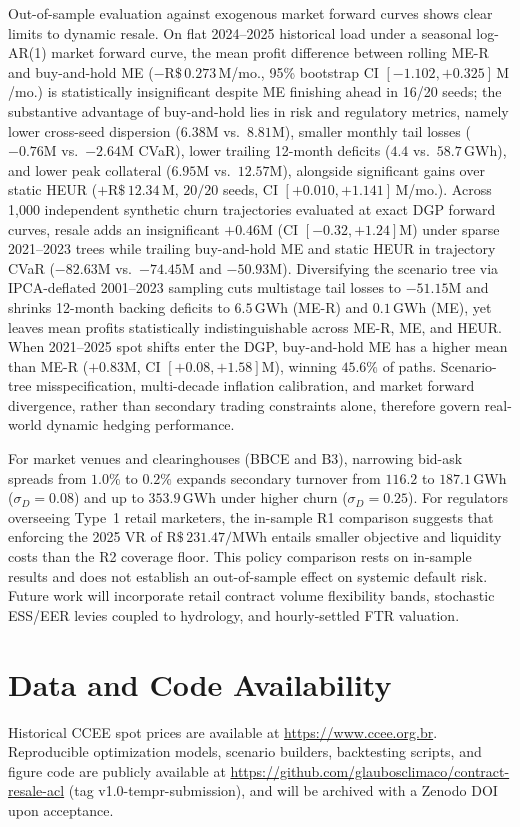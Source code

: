 \documentclass[10pt,journal]{IEEEtran}
\begin{document}
Out-of-sample evaluation against exogenous market forward curves shows clear limits to dynamic resale. On flat 2024--2025 historical load under a seasonal log-AR(1) market forward curve, the mean profit difference between rolling ME-R and buy-and-hold ME ($-\text{R\$}\,0.273\,\text{M}$/mo., 95\% bootstrap CI $[-1.102, +0.325]\,\text{M}$/mo.) is statistically insignificant despite ME finishing ahead in 16/20 seeds; the substantive advantage of buy-and-hold lies in risk and regulatory metrics, namely lower cross-seed dispersion ($6.38\text{M}$ vs.\ $8.81\text{M}$), smaller monthly tail losses ($-0.76\text{M}$ vs.\ $-2.64\text{M}$ CVaR), lower trailing 12-month deficits ($4.4$ vs.\ $58.7\,\text{GWh}$), and lower peak collateral ($6.95\text{M}$ vs.\ $12.57\text{M}$), alongside significant gains over static HEUR ($+\text{R\$}\,12.34\,\text{M}$, $20/20$ seeds, CI $[+0.010, +1.141]\,\text{M}$/mo.). Across 1,000 independent synthetic churn trajectories evaluated at exact DGP forward curves, resale adds an insignificant $+0.46\text{M}$ (CI $[-0.32, +1.24]\text{M}$) under sparse 2021--2023 trees while trailing buy-and-hold ME and static HEUR in trajectory CVaR ($-82.63\text{M}$ vs.\ $-74.45\text{M}$ and $-50.93\text{M}$). Diversifying the scenario tree via IPCA-deflated 2001--2023 sampling cuts multistage tail losses to $-51.15\text{M}$ and shrinks 12-month backing deficits to $6.5\,\text{GWh}$ (ME-R) and $0.1\,\text{GWh}$ (ME), yet leaves mean profits statistically indistinguishable across ME-R, ME, and HEUR. When 2021--2025 spot shifts enter the DGP, buy-and-hold ME has a higher mean than ME-R ($+0.83\text{M}$, CI $[+0.08, +1.58]\text{M}$), winning $45.6\%$ of paths. Scenario-tree misspecification, multi-decade inflation calibration, and market forward divergence, rather than secondary trading constraints alone, therefore govern real-world dynamic hedging performance.

For market venues and clearinghouses (BBCE and B3), narrowing bid-ask spreads from $1.0\%$ to $0.2\%$ expands secondary turnover from $116.2$ to $187.1\,\text{GWh}$ ($\sigma_D = 0.08$) and up to $353.9\,\text{GWh}$ under higher churn ($\sigma_D = 0.25$). For regulators overseeing Type~1 retail marketers, the in-sample R1 comparison suggests that enforcing the 2025 VR of $\text{R\$}\,231.47/\text{MWh}$ entails smaller objective and liquidity costs than the R2 coverage floor. This policy comparison rests on in-sample results and does not establish an out-of-sample effect on systemic default risk. Future work will incorporate retail contract volume flexibility bands, stochastic ESS/EER levies coupled to hydrology, and hourly-settled FTR valuation.

\section*{Data and Code Availability}
Historical CCEE spot prices are available at \url{https://www.ccee.org.br}. Reproducible optimization models, scenario builders, backtesting scripts, and figure code are publicly available at \url{https://github.com/glaubosclimaco/contract-resale-acl} (tag v1.0-tempr-submission), and will be archived with a Zenodo DOI upon acceptance.



\end{document}
